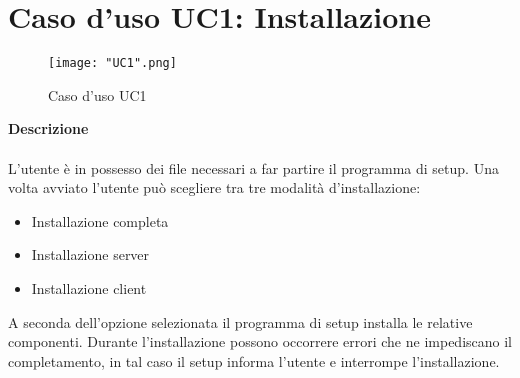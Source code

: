 \documentclass[a4paper]{report}
\begin{document}
		\section{Caso d'uso UC1: Installazione}
			\begin{figure}[H]
				\centering
				\texttt{[image: "UC1".png]}
				\caption{Caso d'uso UC1}
			\end{figure}
		 \textbf{Descrizione} \\ \\
		 L'utente è in possesso dei file necessari a far partire il programma di setup. Una volta avviato
		  l'utente può scegliere tra tre modalità d'installazione: 
		 \begin{itemize}
		 	\item Installazione completa
		 	\item Installazione server
		 	\item Installazione client
		 \end{itemize}
		 A seconda dell'opzione selezionata il programma di setup installa le relative componenti. Durante 
		 l'installazione possono occorrere errori che ne impediscano il completamento, in tal caso il setup
		 informa l'utente e interrompe l'installazione.
\end{document}
